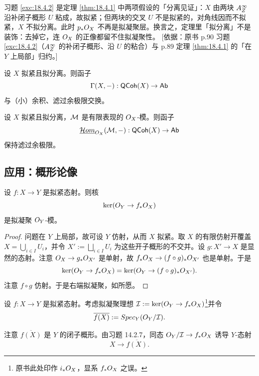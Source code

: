 \begin{yizhu}
习题 \ref{exc:18.4.2} 是定理 \ref{thm:18.4.1} 中两项假设的「分离见证」：$X$ 由两块 $A^\infty_Z$ 沿补闭子概形 $U$ 粘成，故拟紧；但两块的交叉 $U$ 不是拟紧的，对角线因而不拟紧，$X$ 不拟分离。此时 $p_*O_X$ 不再是拟凝聚层。换言之，定理里「拟分离」不是装饰：去掉它，连 $O_X$ 的正像都留不住拟凝聚性。
[依据：原书 p.90 习题 \ref{exc:18.4.2}（$A^\infty_Z$ 的补闭子概形、沿 $U$ 的粘合）与 p.89 定理 \ref{thm:18.4.1} 的「在 $Y$ 上局部」归约。]
\end{yizhu}

\begin{corollary}\label{cor:18.4.3}
设 $X$ 拟紧且拟分离。则函子
\[
\Gamma(X,-):\mathsf{QCoh}(X)\to\mathsf{Ab}
\]
与（小）余积、滤过余极限交换。
\end{corollary}

\begin{exercise}\label{exc:18.4.4}
设 $X$ 拟紧且拟分离，$\mathcal{M}$ 是有限表现的 $O_X$-模。则函子
\[
\underline{\mathcal{H}om}_{O_X}(\mathcal{M},-):\mathsf{QCoh}(X)\to\mathsf{Ab}
\]
保持滤过余极限。
\end{exercise}

\subsection{应用：概形论像}\label{sec:18.5}

\begin{lemma}\label{lem:18.5.1}
设 $f:X\to Y$ 是拟紧态射。则核
\[
\ker(O_Y\to f_*O_X)
\]
是拟凝聚 $O_Y$-模。
\end{lemma}

\begin{proof}
问题在 $Y$ 上局部，故可设 $Y$ 仿射，从而 $X$ 拟紧。取 $X$ 的有限仿射开覆盖 $X=\bigcup_{i\in I}U_i$，并令 $X':=\bigsqcup_{i\in I}U_i$ 为这些开子概形的不交并。设 $g:X'\to X$ 是显然的态射。注意 $O_X\to g_*O_{X'}$ 是单射，故 $f_*O_X\to(f\circ g)_*O_{X'}$ 也是单射。于是
\[
\ker(O_Y\to f_*O_X)=\ker(O_Y\to(f\circ g)_*O_{X'}).
\]
注意 $f\circ g$ 仿射。于是右端拟凝聚，如所愿。
\end{proof}

\begin{construction}\label{con:18.5.2}
设 $f:X\to Y$ 是拟紧态射。考虑拟凝聚理想 $\mathcal{I}:=\ker(O_Y\to f_*O_X)$\footnote{原书此处印作 $i_*O_X$，显系 $f_*O_X$ 之误。}并令
\[
\overline{f(X)}:=Spec_Y(O_Y/\mathcal{I}).
\]
\end{construction}

注意 $\overline{f(X)}$ 是 $Y$ 的闭子概形。由习题 14.2.7，同态 $O_Y/\mathcal{I}\to f_*O_X$ 诱导 $Y$-态射
\[
X\to\overline{f(X)}.
\]

